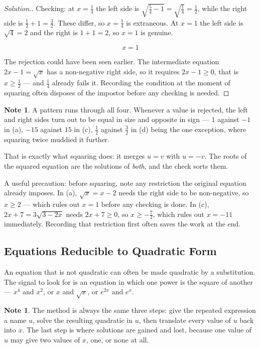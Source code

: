 \documentclass[11pt,a4paper]{article}
\theoremstyle{definition}
\newtheorem{note}[thm]{Note}
\newenvironment{solution}
  {\renewcommand{\qedsymbol}{}\begin{proof}[\textit{Solution}.]}
  {\end{proof}}
\begin{document}
\begin{solution}
Checking: at $x=\frac{1}{4}$ the left side is
$\sqrt{\frac{5}{4}-1}=\sqrt{\frac{1}{4}}=\frac{1}{2}$, while the right side is
$\frac{1}{2}+1=\frac{3}{2}$. These differ, so $x=\frac{1}{4}$ is extraneous. At
$x=1$ the left side is $\sqrt{4}=2$ and the right is $1+1=2$, so $x=1$ is
genuine.

$$\boxed{x=1}$$

The rejection could have been seen earlier. The intermediate equation
$2x-1=\sqrt{x}$ has a non-negative right side, so it requires $2x-1\geq0$, that
is $x\geq\frac{1}{2}$ --- and $\frac{1}{4}$ already fails it. Recording the
condition at the moment of squaring often disposes of the impostor before any
checking is needed.
\end{solution}

\begin{note}
A pattern runs through all four. Whenever a value is rejected, the left and right
sides turn out to be equal in size and opposite in sign --- $1$ against $-1$ in (a),
$-15$ against $15$ in (c), $\frac{1}{2}$ against $\frac{3}{2}$ in (d) being the one
exception, where squaring twice muddied it further.

That is exactly what squaring does: it merges $u=v$ with $u=-v$. The roots of the
squared equation are the solutions of \emph{both}, and the check sorts them.

A useful precaution: before squaring, note any restriction the original equation
already imposes. In (a), $\sqrt{x}=x-2$ needs the right side to be non-negative, so
$x\geq 2$ --- which rules out $x=1$ before any checking is done. In (c),
$2x+7=3\sqrt{3-2x}$ needs $2x+7\geq 0$, so $x\geq-\frac{7}{2}$, which rules out
$x=-11$ immediately. Recording that restriction first often saves the work at the
end.
\end{note}
\pagebreak

\subsection{Equations Reducible to Quadratic Form}

An equation that is not quadratic can often be made quadratic by a substitution.
The signal to look for is an equation in which one power is the square of
another --- $x^{4}$ and $x^{2}$, or $x$ and $\sqrt{x}$, or $e^{2x}$ and $e^{x}$.

\begin{note}
The method is always the same three steps: give the repeated expression a name
$u$, solve the resulting quadratic in $u$, then translate every value of $u$
back into $x$. The last step is where solutions are gained and lost, because
one value of $u$ may give two values of $x$, one, or none at all.
\end{note}
\end{document}
